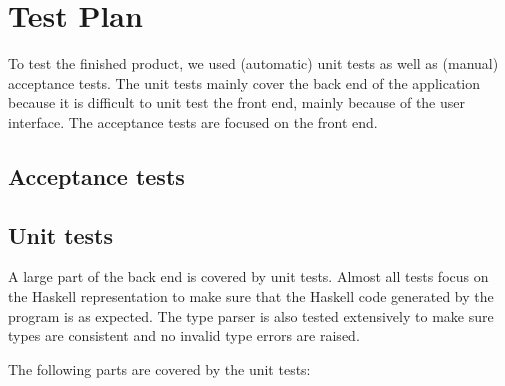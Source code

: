 \chapter{Test Plan}

To test the finished product, we used (automatic) unit tests as well as (manual) acceptance tests.
The unit tests mainly cover the back end of the application because it is difficult to unit test the front end, mainly because of the user interface.
The acceptance tests are focused on the front end.

\section{Acceptance tests} \label{acceptance tests}



\section{Unit tests} \label{unit tests}

A large part of the back end is covered by unit tests.
Almost all tests focus on the Haskell representation to make sure that the Haskell code generated by the program is as expected.
The type parser is also tested extensively to make sure types are consistent and no invalid type errors are raised.

The following parts are covered by the unit tests:

